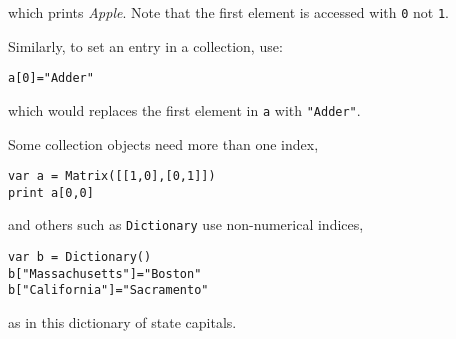 which prints \emph{Apple}. Note that the first element is accessed with
\texttt{0} not \texttt{1}.

Similarly, to set an entry in a collection, use:

\begin{lstlisting}
a[0]="Adder"
\end{lstlisting}

which would replaces the first element in \texttt{a} with
\texttt{"Adder"}.

Some collection objects need more than one index,

\begin{lstlisting}
var a = Matrix([[1,0],[0,1]])
print a[0,0]
\end{lstlisting}

and others such as \texttt{Dictionary} use non-numerical indices,

\begin{lstlisting}
var b = Dictionary()
b["Massachusetts"]="Boston"
b["California"]="Sacramento"
\end{lstlisting}

as in this dictionary of state capitals.
